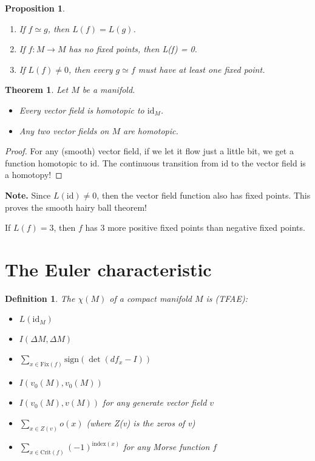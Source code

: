 \documentclass[11pt]{amsbook}
\newenvironment{dateenv}{
	\vspace{1em}
}{
	\vspace{1em}
}
\newcommand{\mydate}[4]{
	\newdate{#1}{#2}{#3}{#4}
	\begin{dateenv}
		\hfill\displaydate{#1}
	\end{dateenv}
}
\theoremstyle{mystyle} \newtheorem{thrm}[thm]{Theorem}
\theoremstyle{mystyle} \newtheorem{defi}[thm]{Definition}
\theoremstyle{mystyle} \newtheorem{coro}[thm]{Corollary}
\theoremstyle{mystyle} \newtheorem{propo}[thm]{Proposition}
\theoremstyle{mystyle} \newtheorem{lemm}[thm]{Lemma}
\numberwithin{thm}{section}
\newcommand{\id}{\text{id}}
\newcommand{\Fix}{\text{Fix}}
\newcommand{\sign}{\text{sign}}
\newcommand{\Crit}{\text{Crit}}
\newcommand{\homotopic}{\simeq}
\begin{document}
\begin{propo}
	\begin{enumerate}
		\item If $f \homotopic g$, then $L(f) = L(g)$.

		\item If $f: M \to M$ has no fixed points, then L(f) = 0.

		\item If $L(f) \neq 0$, then every $g \homotopic f$ must have at least one fixed point.
	\end{enumerate}
\end{propo}

\begin{thrm}
	Let $M$ be a manifold.
	\begin{itemize}
		\item Every vector field is homotopic to $\id_M$.
		\item Any two vector fields on $M$ are homotopic.
	\end{itemize}
\end{thrm}
\begin{proof}
	For any (smooth) vector field, if we let it flow just a little bit, we get a function homotopic to $\id$. The continuous transition from $\id$ to the vector field is a homotopy!
\end{proof}

\textbf{Note.}
Since $L(\id) \neq 0$, then the vector field function also has fixed points. This proves the smooth hairy ball theorem!

\begin{rmk}
	If $L(f) = 3$, then $f$ has 3 more positive fixed points than negative fixed points.
\end{rmk}

\mydate{d18}{28}{11}{2016}

\section{The Euler characteristic}

\begin{defi}
	The  $\chi(M)$ of a compact manifold $M$ is (TFAE):
	\begin{itemize}
		\item $L(\id_M)$
		\item $I(\Delta M, \Delta M)$
		\item $\sum_{x \in \Fix(f)} \sign(\det(df_x - I))$
		\item $I(v_0(M), v_0(M))$
		\item $I(v_0(M), v(M))$ for any generate vector field $v$
		\item $\sum_{x \in Z(v)} o(x)$ (where Z(v) is the zeros of v)
		\item $\sum_{x \in \Crit(f)} (-1)^{\text{index}(x)}$ for any Morse function $f$
	\end{itemize}
\end{defi}
\end{document}
